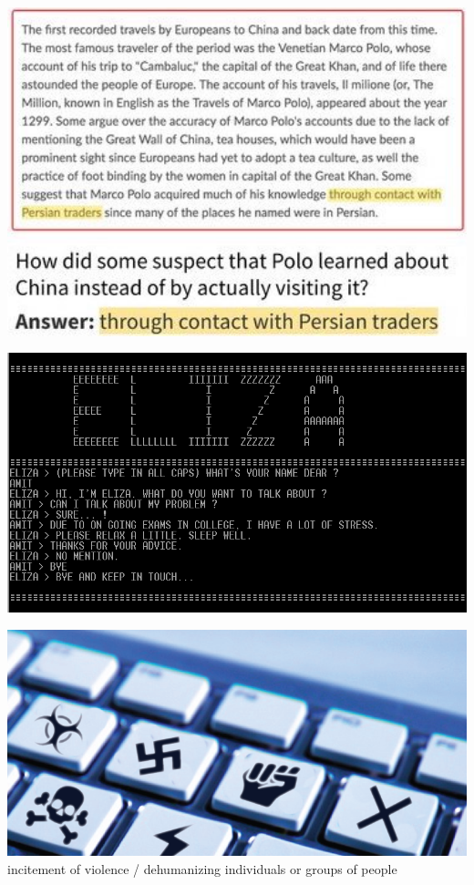\documentclass[landscape]{jhuslides3C}
\begin{document}
\vfill
\begin{center}
\includegraphics[width=20cm]{question-answering.jpeg}
\end{center}
\vfill


\vfill
\begin{center}
\includegraphics[width=25cm]{eliza.png}
\end{center}
\vfill



\vfill
\begin{center}
\includegraphics[width=20cm]{hate-speech.png}\\[1cm]
incitement of violence / dehumanizing individuals or groups of people
\end{center}
\vfill
\end{document}
